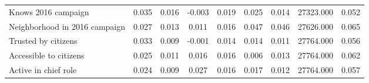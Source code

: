 {\begin{tabular}{l*{8}{c}}
Knows 2016 campaign & 0.035 & 0.016 & -0.003 & 0.019 & 0.025 & 0.014 & 27323.000 & 0.052 \\
Neighborhood in 2016 campaign & 0.027 & 0.013 & 0.011 & 0.016 & 0.047 & 0.046 & 27626.000 & 0.065 \\
Trusted by citizens & 0.033 & 0.009 & -0.001 & 0.014 & 0.014 & 0.011 & 27764.000 & 0.056 \\
Accessible to citizens & 0.025 & 0.011 & 0.016 & 0.016 & 0.006 & 0.013 & 27764.000 & 0.062 \\
Active in chief role & 0.024 & 0.009 & 0.027 & 0.016 & 0.017 & 0.012 & 27764.000 & 0.057 \\
\hline\hline \end{tabular} }
